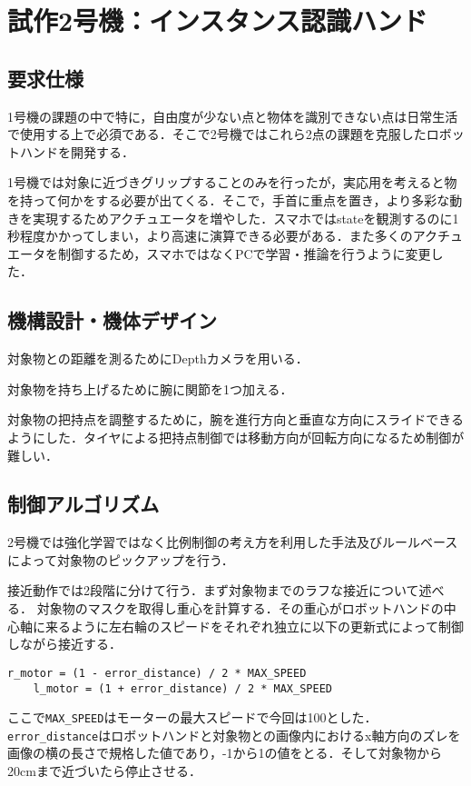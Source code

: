 \chapter{試作2号機：インスタンス認識ハンド}
\newpage

\section{要求仕様}
1号機の課題の中で特に，自由度が少ない点と物体を識別できない点は日常生活で使用する上で必須である．そこで2号機ではこれら2点の課題を克服したロボットハンドを開発する．

1号機では対象に近づきグリップすることのみを行ったが，実応用を考えると物を持って何かをする必要が出てくる．そこで，手首に重点を置き，より多彩な動きを実現するためアクチュエータを増やした．スマホではstateを観測するのに1秒程度かかってしまい，より高速に演算できる必要がある．また多くのアクチュエータを制御するため，スマホではなくPCで学習・推論を行うように変更した．




\section{機構設計・機体デザイン}


対象物との距離を測るためにDepthカメラを用いる．

対象物を持ち上げるために腕に関節を1つ加える．

対象物の把持点を調整するために，腕を進行方向と垂直な方向にスライドできるようにした．タイヤによる把持点制御では移動方向が回転方向になるため制御が難しい．


\section{制御アルゴリズム}
2号機では強化学習ではなく比例制御の考え方を利用した手法及びルールベースによって対象物のピックアップを行う．

接近動作では2段階に分けて行う．まず対象物までのラフな接近について述べる．
対象物のマスクを取得し重心を計算する．その重心がロボットハンドの中心軸に来るように左右輪のスピードをそれぞれ独立に以下の更新式によって制御しながら接近する．
\begin{lstlisting}[basicstyle=\ttfamily\footnotesize]
    r_motor = (1 - error_distance) / 2 * MAX_SPEED
    l_motor = (1 + error_distance) / 2 * MAX_SPEED
\end{lstlisting}
ここで\texttt{MAX\_SPEED}はモーターの最大スピードで今回は100とした．\texttt{error\_distance}はロボットハンドと対象物との画像内におけるx軸方向のズレを画像の横の長さで規格した値であり，-1から1の値をとる．そして対象物から20cmまで近づいたら停止させる．

